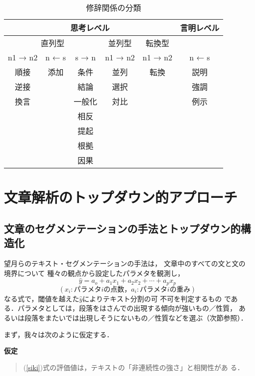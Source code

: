 \begin{table}[htb]
\begin{center}
\begin{tabular}{|c|c|c|c|c|c|}\hline
\multicolumn{5}{|c|}{思考レベル} &  言明レベル \\ \hline
\multicolumn{3}{|c|}{直列型} & 並列型 & 転換型 & \\ \hline
n1 → n2 & n ← s & s → n & n1 → n2 & n1 → n2 & n ← s \\ \hline
順接 & 添加 & 条件 & 並列 & 転換 & 説明 \\
逆接 &      & 結論 & 選択 &      & 強調 \\
換言 &      & 一般化 & 対比 &    & 例示 \\
     &      & 相反 &      &      & \\
     &      & 提起 &      &      & \\
     &      & 根拠 &      &      & \\
     &      & 因果 &      &      & \\  \hline
\end{tabular}
\end{center}
\caption{修辞関係の分類}\label{rheto}
\end{table}

\section{文章解析のトップダウン的アプローチ} \label{top1}

\subsection{文章のセグメンテーションの手法とトップダウン的構造化} \label{top2}

望月ら\cite{Mochiduki:96}のテキスト・セグメンテーションの手法は，
文章中のすべての文と文の境界について
種々の観点から設定したパラメタを観測し，
\begin{equation}
\hat{y} = a_o + a_1x_1 +a_2x_2 + \cdots + a_px_p \label{siki}
\end{equation}
\[ (x_i:パラメタiの点数，a_i:パラメタiの重み) \]
なる式で，閾値を越えた\hspace{-0.2mm}$\hat{y}$\hspace{-0.2mm}によりテキスト分割の可
不可を判定するもの
である．パラメタとしては，段落をはさんでの出現する傾向が強いもの／性質，
あるいは段落をまたいでは出現しそうにないもの／性質などを選ぶ（次節参照）．

まず，我々は次のように仮定する．
\begin{description}
\item{\bf 仮定}
\begin{quote}
(\ref{siki})式の評価値は，テキストの「非連続性の強さ」と相関性があ
る．
\end{quote}
\end{description}

